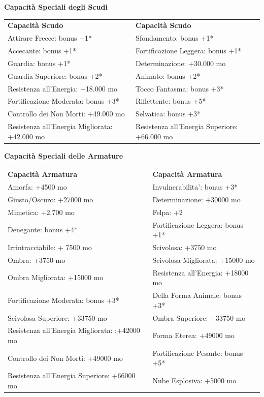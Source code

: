 \documentclass[a4paper,11pt,twoside,openany]{book}
\begin{document}
{\bigskip

\textbf{Capacità Speciali degli Scudi}

\medskip

\begin{tabular}{ll}
\toprule
\textbf{Capacità Scudo} & \textbf{Capacità Scudo}\tabularnewline
Attirare Frecce: bonus +1{*} & Sfondamento: bonus +1{*}\tabularnewline
Accecante: bonus +1{*} & Fortificazione Leggera: bonus +1{*}\tabularnewline
Guardia: bonus +1{*} & Determinazione: +30.000 mo\tabularnewline
Guardia Superiore: bonus +2{*} & Animato: bonus +2{*}\tabularnewline
Resistenza all'Energia: +18.000 mo & Tocco Fantasma: bonus +3{*}\tabularnewline
Fortificazione Moderata: bonus +3{*} & Riflettente: bonus +5{*}\tabularnewline
Controllo dei Non Morti: +49.000 mo & Selvatica: bonus +3{*}\tabularnewline
Resistenza all'Energia Migliorata: +42.000 mo & Resistenza all'Energia Superiore: +66.000 mo\tabularnewline
\end{tabular}

\bigskip

\textbf{Capacità Speciali delle Armature}

\begin{tabular}{ll}
\toprule
\textbf{Capacità Armatura} & \textbf{Capacità Armatura}\tabularnewline
Amorfa:\index{Amorfa} +4500 mo & Invulnerabilita'\index{Invulnerabilita'}: bonus +3{*}\tabularnewline
Giusto/Oscuro:\index{Giusto/Oscuro:} +27000 mo & Determinazione\index{Determinazione}: +30000 mo\tabularnewline
Mimetica: \index{Mimetica}+2.700 mo & Felpa\index{Felpa}: +2\tabularnewline
Denegante:\index{Denegante} bonus +4{*} & Fortificazione Leggera\index{Fortificazione Leggera}: bonus +1{*}\tabularnewline
Irrintracciabile:\index{Irrintracciabile} + 7500 mo & Scivolosa\index{Scivolosa}: +3750 mo\tabularnewline
Ombra: \index{Ombra}+3750 mo & Scivolosa Migliorata\index{Scivolosa Migliorata}: +15000 mo\tabularnewline
Ombra Migliorata:\index{Ombra Migliorata} +15000 mo & Resistenza all'Energia: \index{Resistenza all'Energia}+18000 mo\tabularnewline
Fortificazione Moderata: \index{Fortificazione Moderata}bonus +3{*} & Della Forma Animale\index{Della Forma Animale}: bonus +3{*}\tabularnewline
Scivolosa Superiore:\index{Scivolosa Superiore} +33750 mo & Ombra Superiore: \index{Ombra Superiore}+33750 mo\tabularnewline
Resistenza all'Energia Migliorata: \index{Resistenza all'Energia Migliorata}:+42000 mo & Forma Eterea\index{Forma Eterea}: +49000 mo\tabularnewline
Controllo dei Non Morti:\index{Controllo dei Non Morti} +49000 mo & Fortificazione Pesante:\index{Fortificazione Pesante} bonus +5{*}\tabularnewline
Resistenza all'Energia Superiore\index{Resistenza all'Energia Superiore}: +66000 mo & Nube Esplosiva\index{Nube Esplosiva}: +5000 mo\tabularnewline
\end{tabular}

}
\end{document}
